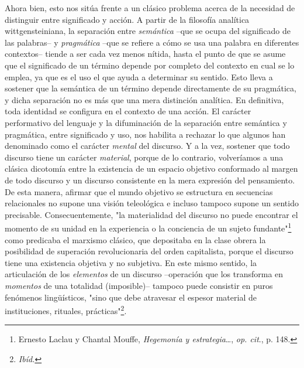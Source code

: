 \documentclass{book}
\begin{document}
Ahora bien, esto nos sitúa frente a un clásico problema acerca de la
necesidad de distinguir entre significado y acción. A partir de la
filosofía analítica wittgensteiniana, la separación entre
\emph{semántica} --que se ocupa del significado de las palabras-- y
\emph{pragmática} --que se refiere a cómo se usa una palabra en
diferentes contextos-- tiende a ser cada vez menos nítida, hasta el
punto de que se asume que el significado de un término depende por
completo del contexto en cual se lo emplea, ya que es el uso el que
ayuda a determinar su sentido. Esto lleva a sostener que la semántica de
un término depende directamente de su pragmática, y dicha separación no
es más que una mera distinción analítica. En definitiva, toda identidad
se configura en el contexto de una acción. El carácter performativo del
lenguaje y la difuminación de la separación entre semántica y
pragmática, entre significado y uso, nos habilita a rechazar lo que
algunos han denominado como el carácter \emph{mental} del discurso. Y a
la vez, sostener que todo discurso tiene un carácter \emph{material},
porque de lo contrario, volveríamos a una clásica dicotomía entre la
existencia de un espacio objetivo conformado al margen de todo discurso
y un discurso consistente en la mera expresión del pensamiento. De esta
manera, afirmar que el mundo objetivo se estructura en secuencias
relacionales no supone una visión teleológica e incluso tampoco supone
un sentido precisable. Consecuentemente, "la materialidad del discurso
no puede encontrar el momento de su unidad en la experiencia o la
conciencia de un sujeto fundante"\footnote{Ernesto Laclau y Chantal
  Mouffe, \emph{Hegemonía y estrategia}\ldots, \emph{op. cit}., p. 148.}
como predicaba el marxismo clásico, que depositaba en la clase obrera la
posibilidad de superación revolucionaria del orden capitalista, porque
el discurso tiene una existencia objetiva y no subjetiva. En este mismo
sentido, la articulación de los \emph{elementos} de un discurso
--operación que los transforma en \emph{momentos} de una totalidad
(imposible)-- tampoco puede consistir en puros fenómenos lingüísticos,
"sino que debe atravesar el espesor material de instituciones, rituales,
prácticas"\footnote{\emph{Ibíd.}}.
\end{document}
